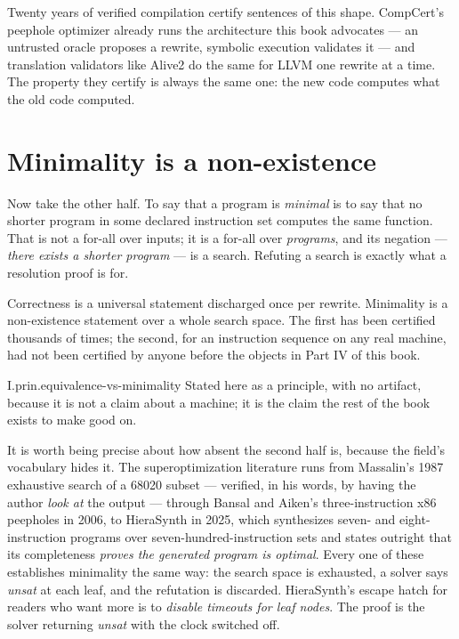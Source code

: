 Twenty years of verified compilation certify sentences of this shape. CompCert's peephole optimizer already runs the architecture this book advocates --- an untrusted oracle proposes a rewrite, symbolic execution validates it --- and translation validators like Alive2 do the same for LLVM one rewrite at a time. The property they certify is always the same one: the new code computes what the old code computed.

\section{Minimality is a non-existence}
\label{sec:minimality}

Now take the other half. To say that a program is \emph{minimal} is to say that no shorter program in some declared instruction set computes the same function. That is not a for-all over inputs; it is a for-all over \emph{programs}, and its negation --- \emph{there exists a shorter program} --- is a search. Refuting a search is exactly what a resolution proof is for.

\begin{keyidea}[title={The asymmetry in one sentence}]
Correctness is a universal statement discharged once per rewrite. Minimality is a non-existence statement over a whole search space. The first has been certified thousands of times; the second, for an instruction sequence on any real machine, had not been certified by anyone before the objects in Part IV of this book.
\end{keyidea}

\begin{artifact}{I.prin.equivalence-vs-minimality}
Stated here as a principle, with no artifact, because it is not a claim about a machine; it is the claim the rest of the book exists to make good on.
\end{artifact}

It is worth being precise about how absent the second half is, because the field's vocabulary hides it. The superoptimization literature runs from Massalin's 1987 exhaustive search of a 68020 subset --- verified, in his words, by having the author \emph{look at} the output --- through Bansal and Aiken's three-instruction x86 peepholes in 2006, to HieraSynth in 2025, which synthesizes seven- and eight-instruction programs over seven-hundred-instruction sets and states outright that its completeness \emph{proves the generated program is optimal}. Every one of these establishes minimality the same way: the search space is exhausted, a solver says \emph{unsat} at each leaf, and the refutation is discarded. HieraSynth's escape hatch for readers who want more is to \emph{disable timeouts for leaf nodes}. The proof is the solver returning \emph{unsat} with the clock switched off.

